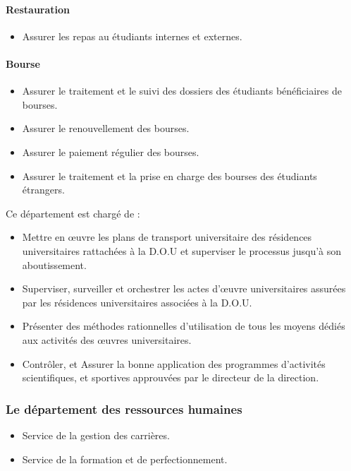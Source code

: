 \paragraph{Restauration}
\begin{itemize}
    \item Assurer les repas au étudiants internes et externes.
\end{itemize}

\paragraph{Bourse}
\begin{itemize}
    \item Assurer le traitement et le suivi des dossiers des étudiants bénéficiaires de bourses.
    \item Assurer le renouvellement des bourses.
    \item Assurer le paiement régulier des bourses.
    \item Assurer le traitement et la prise en charge des bourses des étudiants étrangers.\\
\end{itemize}

Ce département est chargé de :
\begin{itemize}\renewcommand{\labelitemi}{$\bullet$}
    \item Mettre en œuvre les plans de transport universitaire des résidences universitaires rattachées à la \acs{D.O.U} et superviser le processus jusqu'à son aboutissement.
    \item Superviser, surveiller et orchestrer les actes d'œuvre universitaires assurées par les résidences universitaires associées à la \acs{D.O.U}.
    \item Présenter des méthodes rationnelles d'utilisation de tous les moyens dédiés aux activités des œuvres universitaires.
    \item Contrôler, et Assurer la bonne application des programmes d'activités scientifiques, et sportives approuvées par le directeur de la direction.\\
\end{itemize}

\subsubsection{Le département des ressources humaines}
\begin{itemize}
    \item Service de la gestion des carrières.
    \item Service de la formation et de perfectionnement.\\
\end{itemize}

